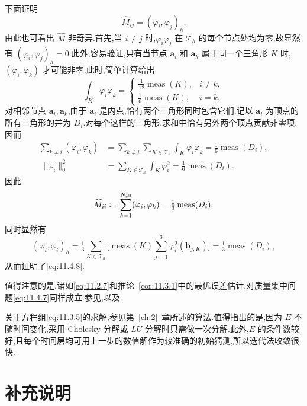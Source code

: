 下面证明
\begin{equation}\label{eq:11.4.8}
  \widehat M_{ij}=(\varphi_i,\varphi_j)_h.
\end{equation}
由此也可看出 \(\widehat M\) 非奇异.首先,当 \(i\ne j\) 时,\(\varphi_i\varphi_j\) 在 \(\mathcal T_h\) 的每个节点处均为零,故显然有 \((\varphi_i,\varphi_j)_h=0\).此外,容易验证,只有当节点 \(\boldsymbol{a}_i\) 和 \(\boldsymbol{a}_k\) 属于同一个三角形 \(K\) 时,\((\varphi_i,\varphi_k)\) 才可能非零.此时,简单计算给出
\[
  \int_K\varphi_i\varphi_k=
  \begin{cases}
    \tfrac1{12}\operatorname{meas}(K), & i\ne k,\\[2pt]
    \tfrac16\operatorname{meas}(K), & i=k.
  \end{cases}
\]
对相邻节点 \(\boldsymbol{a}_i,\boldsymbol{a}_k\),由于 \(\boldsymbol{a}_i\) 是内点,恰有两个三角形同时包含它们.记以 \(\boldsymbol{a}_i\) 为顶点的所有三角形的并为 \(D_i\).对每个这样的三角形,求和中恰有另外两个顶点贡献非零项,因而
\[
  \begin{aligned}
    \sum_{k\ne i}(\varphi_i,\varphi_k)
      &=\sum_{k\ne i}\sum_{K\in\mathcal T_h}\int_K\varphi_i\varphi_k
        =\tfrac16\operatorname{meas}(D_i),\\
    \|\varphi_i\|_0^2
      &=\sum_{K\in\mathcal T_h}\int_K\varphi_i^2
        =\tfrac16\operatorname{meas}(D_i).
  \end{aligned}
\]
因此
\[
  \widehat M_{ii}:=\sum_{k=1}^{N_{\rm all}}(\varphi_i,\varphi_k)
    =\tfrac13\operatorname{meas}(D_i).
\]
同时显然有
\[
  (\varphi_i,\varphi_i)_h
    =\tfrac13\sum_{K\in\mathcal T_h}
      \biggl[\operatorname{meas}(K)\sum_{j=1}^3
         \varphi_i^2(\boldsymbol{b}_{j,K})\biggr]
    =\tfrac13\operatorname{meas}(D_i),
\]
从而证明了\eqref{eq:11.4.8}.

值得注意的是,诸如\eqref{eq:11.2.7}和推论~\ref{cor:11.3.1}中的最优误差估计,对质量集中问题\eqref{eq:11.4.7}同样成立.参见,以及.

关于方程组\eqref{eq:11.3.5}的求解,参见第~\ref{ch:2}~章所述的算法.值得指出的是,因为 \(E\) 不随时间变化,采用 Cholesky 分解或 \(LU\) 分解时只需做一次分解.此外,\(E\) 的条件数较好,且每个时间层均可用上一步的数值解作为较准确的初始猜测,所以迭代法收敛很快.

\section{补充说明}\label{sec:11.5}

